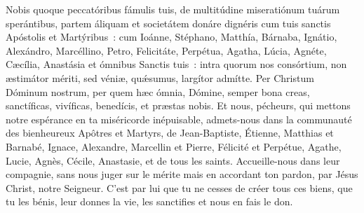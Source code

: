 \begin{paracol}{2}
\LigneParacol{0cm}
{Nobis quoque peccatóribus fámulis tuis, de multitúdine miseratiónum tuárum sperántibus, partem áliquam et societátem donáre dignéris cum tuis sanctis Apóstolis et Martýribus~: cum Ioánne, Stéphano, Matthía, Bárnaba, Ignátio, Alexándro, Marcéllino, Petro, Felicitáte, Perpétua, Agatha, Lúcia, Agnéte, Cæcília, Anastásia et ómnibus Sanctis tuis~: intra quorum nos consórtium, non æstimátor mériti, sed véniæ, quǽsumus, largítor admítte. Per Christum Dóminum nostrum, per quem hæc ómnia, Dómine, semper bona creas, sanctíficas, vivíficas, benedícis, et præstas nobis.}
{Et nous, pécheurs, qui mettons notre espérance en ta miséricorde inépuisable, admets-nous dans la communauté des bienheureux Apôtres et Martyrs, de Jean-Baptiste, Étienne, Matthias et Barnabé, Ignace, Alexandre, Marcellin et Pierre, Félicité et Perpétue, Agathe, Lucie, Agnès, Cécile, Anastasie, et de tous les saints. Accueille-nous dans leur compagnie, sans nous juger sur le mérite mais en accordant ton pardon, par Jésus Christ, notre Seigneur. C'est par lui que tu ne cesses de créer tous ces biens, que tu les bénis, leur donnes la vie, les sanctifies et nous en fais le don.}

\end{paracol}

